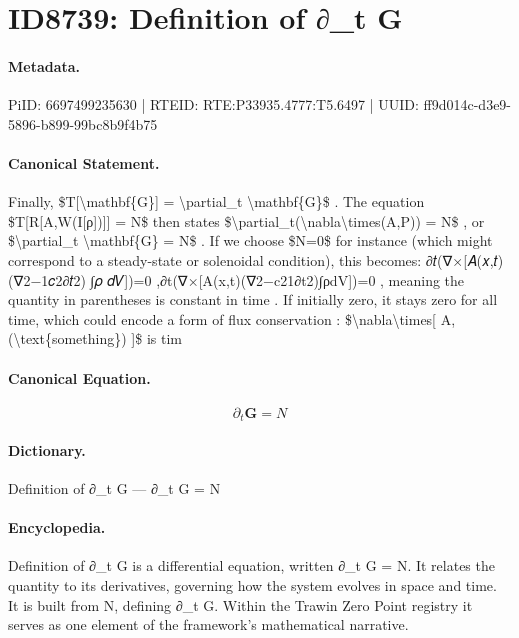 \section*{ID8739: Definition of ∂\_t G}
\paragraph{Metadata.}
PiID: 6697499235630 | RTEID: RTE:P33935.4777:T5.6497 | UUID: ff9d014c-d3e9-5896-b899-99bc8b9f4b75

\paragraph{Canonical Statement.}
Finally, \$T[\textbackslash{}mathbf\{G\}] = \textbackslash{}partial\_t \textbackslash{}mathbf\{G\}\$ . The equation \$T[R[A,W(I[ρ])]] = N\$ then states \$\textbackslash{}partial\_t(\textbackslash{}nabla\textbackslash{}times(A,P)) = N\$ , or \$\textbackslash{}partial\_t \textbackslash{}mathbf\{G\} = N\$ . If we choose \$N=0\$ for instance (which might correspond to a steady-state or solenoidal condition), this becomes: ∂𝑡(∇×[𝐴(𝑥,𝑡) (∇2−1𝑐2∂𝑡2) ⁣∫𝜌 𝑑𝑉])=0 ,∂t​(∇×[A(x,t)(∇2−c21​∂t2​)∫ρdV])=0 , meaning the quantity in parentheses is constant in time . If initially zero, it stays zero for all time, which could encode a form of flux conservation : \$\textbackslash{}nabla\textbackslash{}times[ A,(\textbackslash{}text\{something\}) ]\$ is tim

\paragraph{Canonical Equation.}
\[
\partial_t \mathbf{G} = N
\]

\paragraph{Dictionary.}
Definition of ∂\_t G — ∂\_t G = N

\paragraph{Encyclopedia.}
Definition of ∂\_t G is a differential equation, written ∂\_t G = N. It relates the quantity to its derivatives, governing how the system evolves in space and time. It is built from N, defining ∂\_t G. Within the Trawin Zero Point registry it serves as one element of the framework's mathematical narrative.
